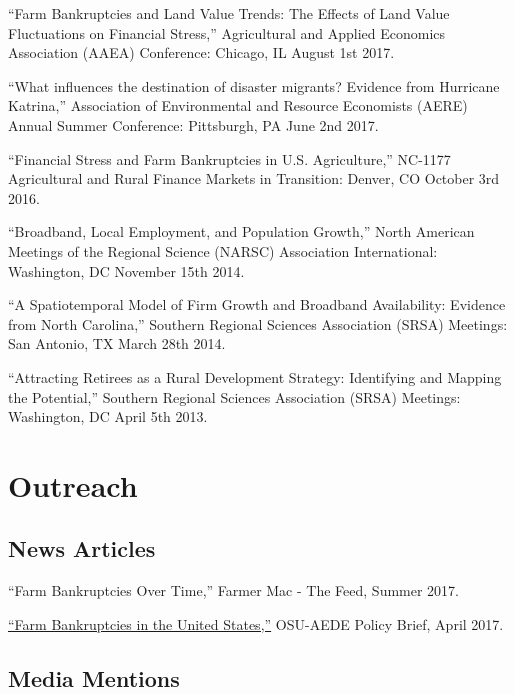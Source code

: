 \documentclass[letterpaper]{article}
\renewenvironment{itemize}{
  \begin{list}{}{
    \setlength{\leftmargin}{1.5em}
  }
}{
  \end{list}
}
\begin{document}
\begin{itemize}
\item ``Farm Bankruptcies and Land Value Trends: The Effects of Land Value Fluctuations on Financial Stress,'' Agricultural and Applied Economics Association (AAEA) Conference: Chicago, IL August 1st 2017.
\item ``What influences the destination of disaster migrants? Evidence from Hurricane Katrina,'' Association of Environmental and Resource Economists (AERE) Annual Summer Conference: Pittsburgh, PA June 2nd 2017.
\item ``Financial Stress and Farm Bankruptcies in U.S. Agriculture,'' NC-1177 Agricultural and Rural Finance Markets in Transition: Denver, CO October 3rd 2016.
\item ``Broadband, Local Employment, and Population Growth,'' North American Meetings of the Regional Science (NARSC) Association International: Washington, DC November 15th 2014.
\item ``A Spatiotemporal Model of Firm Growth and Broadband Availability: Evidence from North Carolina,'' Southern Regional Sciences Association (SRSA) Meetings: San Antonio, TX March 28th 2014.
\item ``Attracting Retirees as a Rural Development Strategy: Identifying and Mapping the Potential,'' Southern Regional Sciences Association (SRSA) Meetings: Washington, DC April 5th 2013.
\end{itemize}

\section*{Outreach}

\subsection*{News Articles}

\begin{itemize}
\item ``Farm Bankruptcies Over Time,'' Farmer Mac - The Feed, Summer 2017.
\item \href{https://aede.osu.edu/sites/aede/files/publication_files/Farm%20Bankruptcies%20-%20Policy%20Brief.pdf}{``Farm Bankruptcies in the United States,''} OSU-AEDE Policy Brief, April 2017.
\end{itemize}

\subsection*{Media Mentions}
\end{document}
